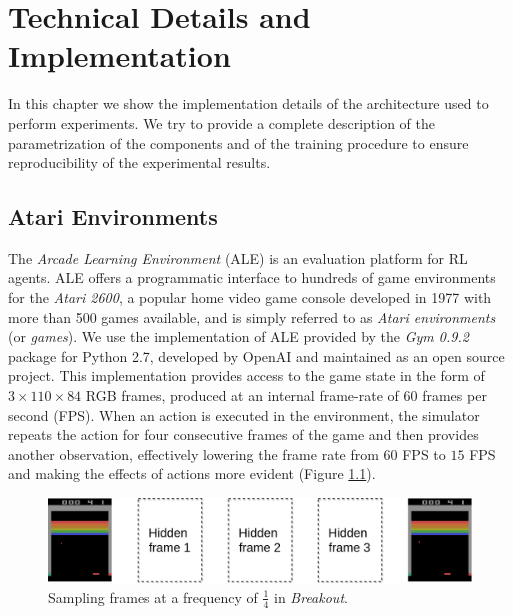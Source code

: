 \chapter{Technical Details and Implementation}
\label{chapter5_technical_details}
\thispagestyle{empty}

\vspace{0.5cm}

In this chapter we show the implementation details of the architecture
used to perform experiments. We try to provide a complete description of the 
parametrization of the components and of the training procedure to ensure 
reproducibility of the experimental results.

\section{Atari Environments}\label{s:atari_envs}
The \textit{Arcade Learning Environment} (ALE) \cite{bellemare2013arcade} is an 
evaluation platform for RL agents.
ALE offers a programmatic interface to hundreds of game environments for the 
\textit{Atari 2600}, a popular home video game console developed in 1977 with 
more than 500 games available, and is simply referred to as 
\textit{Atari environments} (or \textit{games}). 
We use the implementation of ALE provided by the \textit{Gym 0.9.2} package for 
Python 2.7, developed by OpenAI and maintained as an open source project. 
This implementation provides access to the game state in the form of 
$3 \times 110 \times 84$ RGB frames, produced at an internal frame-rate of $60$ 
frames per second (FPS).
When an action is executed in the environment, the simulator repeats the action 
for four consecutive frames of the game and then provides another observation, 
effectively lowering the frame rate from $60$ FPS to $15$ FPS and making the 
effects of actions more evident (Figure \ref{f:sampling}). 
%
\begin{figure}
    \includegraphics[width=\textwidth]{pictures/sampling}
    \centering
    \caption[Sampling frames at a frequency of $\frac{1}{4}$ in \textit{Breakout}]{
	    Sampling frames at a frequency of $\frac{1}{4}$ in \textit{Breakout}.}
    \label{f:sampling}
\end{figure}
%

